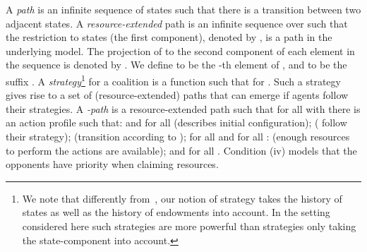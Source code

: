 \documentclass{llncs}
\begin{document}
\vspace{-2ex}
A \emph{path}   is an infinite sequence
of states such that there is a transition between two adjacent states. A
\emph{resource-extended} path  is an infinite sequence over
 such that the restriction to states (the first component),
denoted by , is a path in the underlying model.  The projection of
 to the second component of each element in the sequence is denoted by
. 
We define  to be the -th element of , and
 to be the suffix . A \emph{strategy}\footnote{{We note that differently from~\cite{Bulling/Farwer:10a,Alechina//:14c,Bulling15ral-IJCAI}, our notion of strategy takes the history of states as well as the history of endowments into account. In the setting considered here such strategies are more powerful than strategies only taking the state-component into account.}} for a coalition  is a function 
 such that  for . Such a strategy gives rise to a set of (resource-extended) paths that can emerge if agents  follow their  strategies. A \emph{-path} is a resource-extended path  such that for all 
with  there is an action profile
 such that:
\full{\begin{enumerate}}
\full{\item } and   for all  (describes  initial configuration); 
\full{\item }  
 ( follow their strategy); 
\full{\item }  
 (transition according to ); 
\full{\item } for all  and for all :  
 (enough resources to perform the actions are available); and
 \full{\item}    for all .
\full{\end{enumerate}} Condition (iv) models that the opponents have priority when claiming resources.
\end{document}
